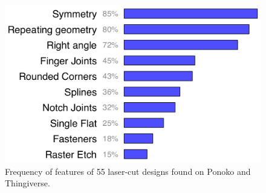 \begin{figure}[t]
  \centering
  \includegraphics[width=0.6\linewidth]{img/ponoko-graph.pdf}
  \caption[Feature analysis of laser cut items]{Frequency of features
    of 55 laser-cut designs found on Ponoko and Thingiverse.}
  \label{fig:ponoko}
\end{figure}
